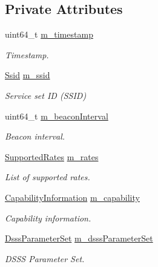 \subsection*{Private Attributes}
\begin{DoxyCompactItemize}
\item 
uint64\+\_\+t \hyperlink{classns3_1_1MgtProbeResponseHeader_aeab17563c28389c4752246ee525d22af}{m\+\_\+timestamp}
\begin{DoxyCompactList}\small\item\em Timestamp. \end{DoxyCompactList}\item 
\hyperlink{classns3_1_1Ssid}{Ssid} \hyperlink{classns3_1_1MgtProbeResponseHeader_a68c26b26d0329128db85f8f151bdbfb6}{m\+\_\+ssid}
\begin{DoxyCompactList}\small\item\em Service set ID (S\+S\+ID) \end{DoxyCompactList}\item 
uint64\+\_\+t \hyperlink{classns3_1_1MgtProbeResponseHeader_a1108654897bdae0b2de2380319662246}{m\+\_\+beacon\+Interval}
\begin{DoxyCompactList}\small\item\em Beacon interval. \end{DoxyCompactList}\item 
\hyperlink{classns3_1_1SupportedRates}{Supported\+Rates} \hyperlink{classns3_1_1MgtProbeResponseHeader_a830a4f67265f50c20a24e2977ee408ba}{m\+\_\+rates}
\begin{DoxyCompactList}\small\item\em List of supported rates. \end{DoxyCompactList}\item 
\hyperlink{classns3_1_1CapabilityInformation}{Capability\+Information} \hyperlink{classns3_1_1MgtProbeResponseHeader_ae3da012e14970d6cab1e7066e023a0cd}{m\+\_\+capability}
\begin{DoxyCompactList}\small\item\em Capability information. \end{DoxyCompactList}\item 
\hyperlink{classns3_1_1DsssParameterSet}{Dsss\+Parameter\+Set} \hyperlink{classns3_1_1MgtProbeResponseHeader_ac3bfab499bbf8d4a3bbcc96204177b43}{m\+\_\+dsss\+Parameter\+Set}
\begin{DoxyCompactList}\small\item\em D\+S\+SS Parameter Set. \end{DoxyCompactList}\item 

\end{DoxyCompactItemize}
